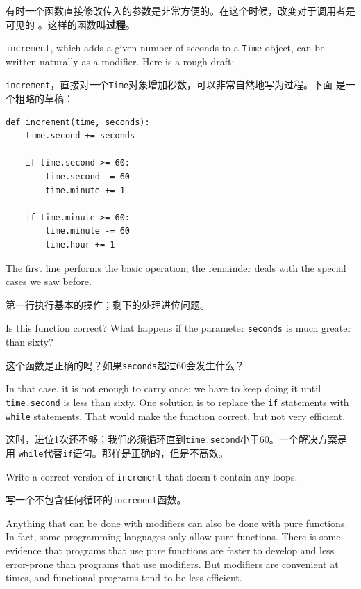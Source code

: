 \documentclass[10pt]{book}
\begin{document}
\begin{CJK}{UTF8}{gbsn}
有时一个函数直接修改传入的参数是非常方便的。在这个时候，改变对于调用者是可见的
。这样的函数叫{\bf 过程}。

{\tt increment}, which adds a given number of seconds to a {\tt Time}
object, can be written naturally as a
modifier.  Here is a rough draft:

{\tt increment}，直接对一个{\tt Time}对象增加秒数，可以非常自然地写为过程。下面
是一个粗略的草稿：

\begin{verbatim}
def increment(time, seconds):
    time.second += seconds

    if time.second >= 60:
        time.second -= 60
        time.minute += 1

    if time.minute >= 60:
        time.minute -= 60
        time.hour += 1
\end{verbatim}
%
The first line performs the basic operation; the remainder deals
with the special cases we saw before.

第一行执行基本的操作；剩下的处理进位问题。

Is this function correct?  What happens if the parameter {\tt seconds}
is much greater than sixty?  

这个函数是正确的吗？如果{\tt seconds}超过60会发生什么？

In that case, it is not enough to carry
once; we have to keep doing it until {\tt time.second} is less than sixty.
One solution is to replace the {\tt if} statements with {\tt while}
statements.  That would make the function correct, but not
very efficient.

这时，进位1次还不够；我们必须循环直到{\tt time.second}小于60。一个解决方案是用
{\tt while}代替{\tt if}语句。那样是正确的，但是不高效。

\begin{exercise}

Write a correct version of {\tt increment} that
doesn't contain any loops.

写一个不包含任何循环的{\tt increment}函数。

\end{exercise}

Anything that can be done with modifiers can also be done with pure
functions.  In fact, some programming languages only allow pure
functions.  There is some evidence that programs that use pure
functions are faster to develop and less error-prone than programs
that use modifiers.  But modifiers are convenient at times,
and functional programs tend to be less efficient.


\end{CJK}
\end{document}
